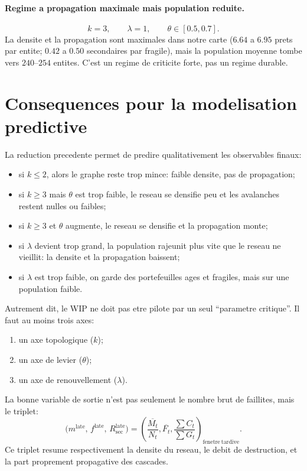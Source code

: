 \documentclass[11pt,a4paper]{article}
\begin{document}
\paragraph{Regime a propagation maximale mais population reduite.}
\[
k=3,\qquad \lambda = 1,\qquad \theta \in [0.5,0.7].
\]
La densite et la propagation sont maximales dans notre carte ($6.64$ a $6.95$ prets par entite; $0.42$ a $0.50$ secondaires par fragile), mais la population moyenne tombe vers $240$--$254$ entites. C'est un regime de criticite forte, pas un regime durable.

\section{Consequences pour la modelisation predictive}
La reduction precedente permet de predire qualitativement les observables finaux:
\begin{itemize}
\item si $k\le 2$, alors le graphe reste trop mince: faible densite, pas de propagation;
\item si $k\ge 3$ mais $\theta$ est trop faible, le reseau se densifie peu et les avalanches restent nulles ou faibles;
\item si $k\ge 3$ et $\theta$ augmente, le reseau se densifie et la propagation monte;
\item si $\lambda$ devient trop grand, la population rajeunit plus vite que le reseau ne vieillit: la densite et la propagation baissent;
\item si $\lambda$ est trop faible, on garde des portefeuilles ages et fragiles, mais sur une population faible.
\end{itemize}

Autrement dit, le WIP ne doit pas etre pilote par un seul ``parametre critique''. Il faut au moins trois axes:
\begin{enumerate}
\item un axe topologique ($k$);
\item un axe de levier ($\theta$);
\item un axe de renouvellement ($\lambda$).
\end{enumerate}

La bonne variable de sortie n'est pas seulement le nombre brut de faillites, mais le triplet:
\[
\big(m^{\mathrm{late}},\, f^{\mathrm{late}},\, R_{\mathrm{sec}}^{\mathrm{late}}\big)
=
\left(
\overline{\frac{M_t}{N_t}},
\overline{F_t},
\frac{\sum C_t}{\sum G_t}
\right)_{\mathrm{fenetre\ tardive}}.
\]
Ce triplet resume respectivement la densite du reseau, le debit de destruction, et la part proprement propagative des cascades.
\end{document}
